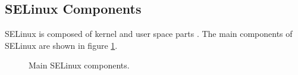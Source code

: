 \subsection{SELinux Components}
SELinux is composed of kernel and user space parts \cite[pp.~19--22]{tsn}. The
main components of SELinux are shown in figure \ref{fig:selinuxcomponents}.

\begin{figure}
    \centering
    \label{fig:selinuxcomponents}
    
    \caption{Main SELinux components.}
\end{figure}

